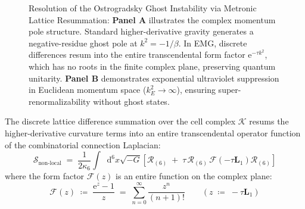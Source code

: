 \documentclass[
    12pt,
    a4paper,
    headings=normal,
    twoside=false,
    open=any,
    parskip=half
]{scrbook}
\newcommand{\diff}{\mathop{}\!\mathrm{d}}
\newcommand{\eu}{\mathrm{e}}
\begin{document}
\begin{figure}[htbp]
\caption{Resolution of the Ostrogradsky Ghost Instability via Metronic Lattice Resummation: \textbf{Panel A} illustrates the complex momentum pole structure. Standard higher-derivative gravity generates a negative-residue ghost pole at $k^2 = -1/\beta$. In EMG, discrete differences resum into the entire transcendental form factor $\eu^{-\tau k^2}$, which has no roots in the finite complex plane, preserving quantum unitarity. \textbf{Panel B} demonstrates exponential ultraviolet suppression in Euclidean momentum space ($k_E^2 \to \infty$), ensuring super-renormalizability without ghost states.}
\label{fig:ch1_propagator_pole_complex}
\end{figure}

\begin{phystheorem}\label{thm:ch1_non_local_form_factor_resummation}
The discrete lattice difference summation over the cell complex $\mathcal{K}$ resums the higher-derivative curvature terms into an entire transcendental operator function of the combinatorial connection Laplacian:
\begin{equation}
\mathcal{S}_{\text{non-local}} \;=\; \frac{1}{2\kappa_6} \int \diff^6 x \sqrt{-G} \left[ \mathcal{R}_{(6)} \;+\; \tau \, \mathcal{R}_{(6)} \, \mathcal{F}\left( -\tau \mathbf{L}_1 \right) \mathcal{R}_{(6)} \right]
\label{eq:ch1_nonlocal_action}
\end{equation}
where the form factor $\mathcal{F}(z)$ is an entire function on the complex plane:
\begin{equation}
\mathcal{F}(z) \;\coloneqq\; \frac{\eu^z - 1}{z} \;=\; \sum_{n=0}^\infty \frac{z^n}{(n+1)!} \qquad (z \;\coloneqq\; -\tau \mathbf{L}_1)
\label{eq:ch1_entire_form_factor}
\end{equation}
\end{phystheorem}
\end{document}
